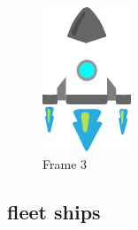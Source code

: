 \begin{figure}[!htb]
  \includegraphics[width=\linewidth]{chapters/modding/shipDetails_3.png}
  \caption*{Frame 3}
\endminipage\hfill
\end{figure}
\newpage
\subsection*{fleet ships}

